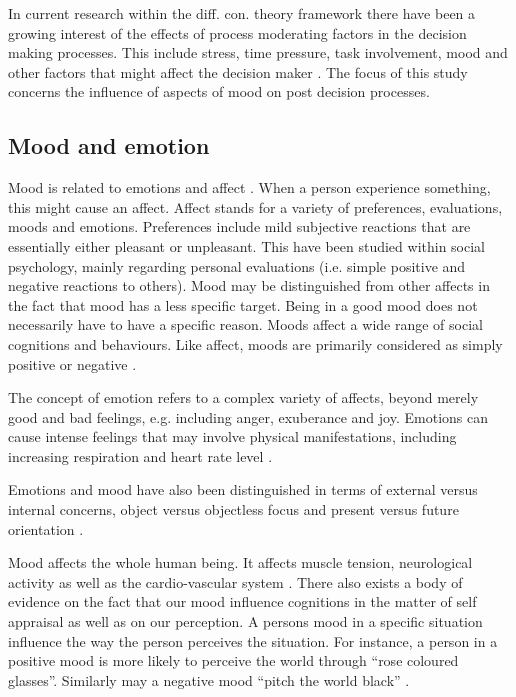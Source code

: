 \documentclass[jou,draftfirst,11pt]{apa6}
\begin{document}
In current research within the diff. con. theory framework there have
been a growing interest of the effects of process moderating factors
in the decision making processes.  This include stress, time pressure,
task involvement, mood and other factors that might affect the
decision maker \parencite{Svensson95}.  The focus of this study concerns the
influence of aspects of mood on post decision processes.


\subsection{Mood and emotion}

Mood is related to emotions and affect \parencite{FiskeTaylor91}. When a
person experience something, this might cause an affect. Affect stands
for a variety of preferences, evaluations, moods and emotions.
Preferences include mild subjective reactions that are essentially
either pleasant or unpleasant.  This have been studied within social
psychology, mainly regarding personal evaluations (i.e.  simple
positive and negative reactions to others).  Mood may be distinguished
from other affects in the fact that mood has a less specific target.
Being in a good mood does not necessarily have to have a specific
reason.  Moods affect a wide range of social cognitions and
behaviours. Like affect, moods are primarily considered as simply
positive or negative \parencite{FiskeTaylor91}.

The concept of emotion refers to a complex variety of affects, beyond
merely good and bad feelings, e.g. including anger, exuberance and
joy.  Emotions can cause intense feelings that may involve physical
manifestations, including increasing respiration and heart rate level
\parencite{FiskeTaylor91}.

Emotions and mood have also been distinguished in terms of external
versus internal concerns, object versus objectless focus and present
versus future orientation \parencite{FiskeTaylor91}.

Mood affects the whole human being.  It affects muscle tension,
neurological activity as well as the cardio-vascular system
\parencite{Izard77}.  There also exists a body of evidence on the fact
that our mood influence cognitions in the matter of self appraisal as
well as on our perception.  A persons mood in a specific situation
influence the way the person perceives the situation.  For instance, a
person in a positive mood is more likely to perceive the world through
``rose coloured glasses''.  Similarly may a negative mood ``pitch the
world black'' \parencite{Izard77}.
\end{document}
